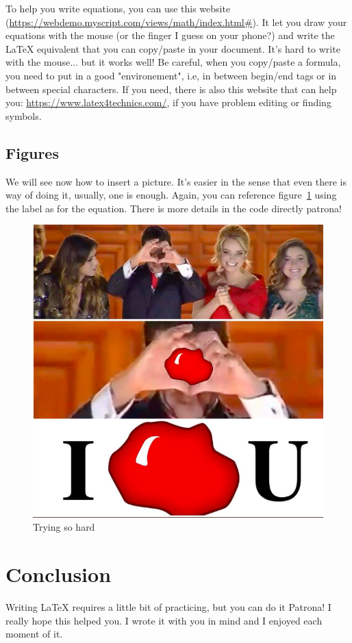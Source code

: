 \documentclass{article}    %
\begin{document}
\noindent To help you write equations, you can use this website (\url{https://webdemo.myscript.com/views/math/index.html#}).
It let you draw your equations with the mouse (or the finger I guess on your phone?) and write the \LaTeX{} equivalent that you can copy/paste in your document.
It's hard to write with the mouse... but it works well! 
Be careful, when you copy/paste a formula, you need to put in a good "environement", i.e, in between begin/end tags or in between special characters.
If you need, there is also this website that can help you: \url{https://www.latex4technics.com/}, if you have problem editing or finding symbols.

\subsection{Figures}
We will see now how to insert a picture.
It's easier in the sense that even there is way of doing it, usually, one is enough. Again, you can reference figure~\ref{tryingsohard} using the label as for the equation.
There is more details in the code directly patrona!

\begin{figure}[htb] %
    \centering
    \includegraphics[width=0.8\linewidth]{myfigure}  
    \caption{Trying so hard}
    \label{tryingsohard}
\end{figure}

\section{Conclusion}
Writing \LaTeX{} requires a little bit of practicing, but you can do it Patrona!
I really hope this helped you.
I wrote it with you in mind and I enjoyed each moment of it.
\end{document}

